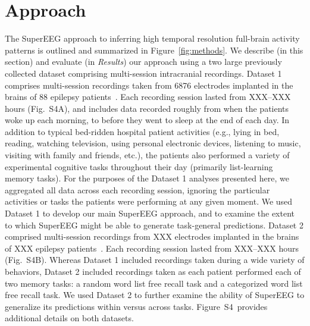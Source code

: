 \documentclass[11pt]{article}
\newcommand{\suppstats}{S4}
\begin{document}
\section*{Approach}
The SuperEEG approach to inferring high temporal resolution full-brain
activity patterns is outlined and summarized in
Figure~\ref{fig:methods}. We describe (in this section) and evaluate
(in \textit{Results}) our approach using a two large previously
collected dataset comprising multi-session intracranial recordings.
Dataset 1 comprises multi-session recordings taken from 6876
electrodes implanted in the brains of 88 epilepsy
patients~\cite{SedeEtal03, SedeEtal07a, SedeEtal07b, MannEtal11,
  MannEtal12}.  Each recording session lasted from XXX--XXX hours
(Fig.~\suppstats A), and includes data recorded roughly from when the
patients woke up each morning, to before they went to sleep at the end
of each day.  In addition to typical bed-ridden hospital patient
activities (e.g., lying in bed, reading, watching television, using
personal electronic devices, listening to music, visiting with family
and friends, etc.), the patients also performed a variety of
experimental cognitive tasks throughout their day (primarily
list-learning memory tasks).  For the purposes of the Dataset 1
analyses presented here, we aggregated all data across each recording
session, ignoring the particular activities or tasks the patients were
performing at any given moment.  We used Dataset 1 to develop our main
SuperEEG approach, and to examine the extent to which SuperEEG might
be able to generate task-general predictions.  Dataset 2 comprised
multi-session recordings from XXX electrodes implanted in the brains
of XXX epilepsy patients~\citep{EzzyEtal17, HoraEtal17, KragEtal17,
  KuceEtal17, LinEtal17, SoloEtal18, WeidEtal18, EzzyEtal18,
  KuceEtal18}.  Each recording session lasted from XXX--XXX hours
(Fig.~\suppstats B).  Whereas Dataset 1 included recordings taken during a
wide variety of behaviors, Dataset 2 included recordings taken as each
patient performed each of two memory tasks: a random word list free
recall task and a categorized word list free recall task.  We used
Dataset 2 to further examine the ability of SuperEEG to generalize its
predictions within versus across tasks.  Figure~\suppstats~provides
additional details on both datasets.
\end{document}
